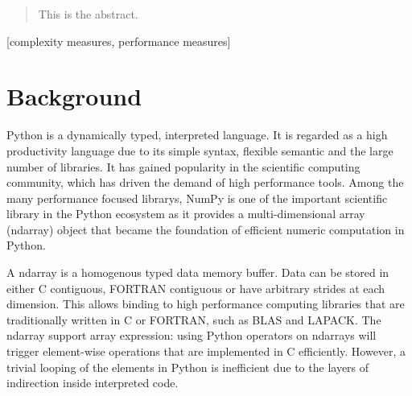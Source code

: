 \documentclass{acm_proc_article-sp}
\begin{document}
\date{30 July 1999}

\maketitle
\begin{abstract}
This is the abstract.
\end{abstract}

[complexity measures, performance measures]



\section{Background}

Python is a dynamically typed, interpreted language.
It is regarded as a high productivity language due to its simple syntax,
flexible semantic and the large number of libraries.
It has gained popularity in the scientific computing community,
which has driven the demand of high performance tools.
Among the many performance focused librarys, NumPy is one of the important
scientific library in the Python ecosystem as it provides a multi-dimensional
array (ndarray) object that became the foundation of efficient numeric
computation in Python.

A ndarray is a homogenous typed data memory buffer.
Data can be stored in either C contiguous, FORTRAN contiguous or have arbitrary
strides at each dimension.  This allows binding to high performance computing
libraries that are traditionally written in C or FORTRAN, such as BLAS and
LAPACK. The ndarray support array expression: using Python operators on
ndarrays will trigger element-wise operations that are implemented in C
efficiently.  However, a trivial looping of the elements in Python is
inefficient due to the layers of indirection inside interpreted code.
\end{document}
